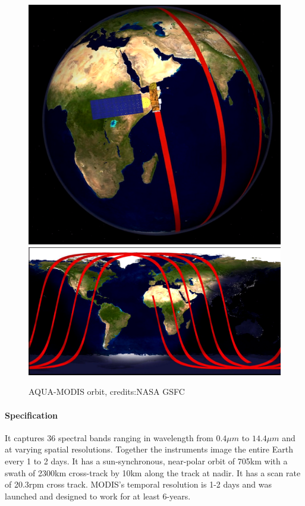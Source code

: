 \begin{figure}
    \centering
    \includegraphics[scale=0.25]{figs/aqua_orbit.png}
    \includegraphics[scale=0.25]{figs/aqua_orbit2.png}
    \caption{AQUA-MODIS orbit, credits:NASA GSFC}
\end{figure}

\paragraph{Specification}
It captures 36 spectral bands ranging in wavelength from $0.4\mu m$ to $14.4\mu m$ and at varying spatial resolutions.
Together the instruments image the entire Earth every 1 to 2 days.
It has a sun-synchronous, near-polar orbit of 705km with a swath of 2300km cross-track by
10km along the track at nadir. It has a scan rate of 20.3rpm cross track.
MODIS's temporal resolution is 1-2 days and was launched and designed to work for at least 6-years.


